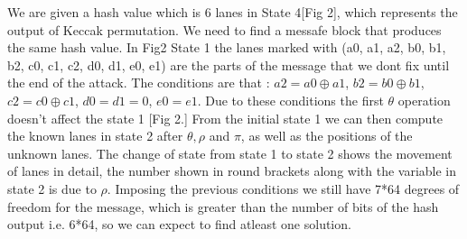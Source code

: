 \documentclass{article}
\begin{document}
\newpar
We are given a hash value which is 6 lanes in State 4[Fig 2], which represents the output of Keccak permutation. We need to find a messafe block that produces the same hash value. In Fig2 State 1 the lanes marked with (a0, a1, a2, b0, b1, b2, c0, c1, c2, d0, d1, e0, e1) are the parts of the message that we dont fix until the end of the attack.
The conditions are that : $a2 = a0 \oplus a1$,  $b2 = b0 \oplus b1$, $c2 = c0 \oplus c1$, $d0 = d1 = 0$, $e0 = e1$. Due to these conditions the first $\theta$ operation doesn't affect the state 1 [Fig 2.] From the initial state 1 we can then compute the known lanes in state 2 after $\theta, \rho$ and $\pi$, as well as the positions of the unknown lanes.
\newpar
The change of state from state 1 to state 2 shows the movement of lanes in detail, the number shown in round brackets along with the variable in state 2 is due to $\rho$. Imposing the previous conditions we still have 7*64 degrees of freedom for the message, which is greater than the number of bits of the hash output i.e. 6*64, so we can expect to find atleast one solution.\newline
\end{document}
